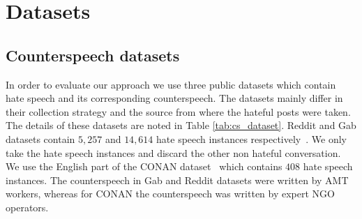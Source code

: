 \chapter{Datasets}



\section{Counterspeech datasets} 
In order to evaluate our approach we use three public datasets which contain hate speech and its corresponding counterspeech. The datasets mainly differ in their collection strategy and the source from where the hateful posts were taken. The details of these datasets are noted in Table \ref{tab:cs_dataset}. Reddit and Gab datasets contain $5,257$ and $14,614$ hate speech instances respectively~\cite{qian2019benchmark}. We only take the hate speech instances and discard the other non hateful conversation.  We use the English part of the CONAN dataset~\cite{chung2019conan} which contains $408$ hate speech instances.  The counterspeech in Gab and Reddit datasets were written by AMT workers, whereas for CONAN the counterspeech was written by expert NGO operators.

